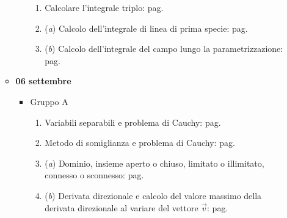\documentclass[a4paper]{article}
\begin{document}
\begin{itemize}
\begin{itemize}
\begin{itemize}
\begin{enumerate}[label*=Ex. \arabic*), leftmargin = 4em]
					\item Calcolare l'integrale triplo: pag.~\hyperlink{
						exam: esame 10 luglio 2023 - Gruppo A - 7 esercizio
					}{
					}

					\item (\emph{a}) Calcolo dell'integrale di linea di prima specie:\newline%
					pag.~\hyperlink{
						exam: esame 06 settembre 2023 - Gruppo A - 8 esercizio (a)
					}{
					}

					\setcounter{enumi}{7}

					\item (\emph{b}) Calcolo dell'integrale del campo lungo la parametrizzazione: pag.~\hyperlink{
						exam: esame 06 settembre 2023 - Gruppo A - 8 esercizio (b)
					}{
					}
				\end{enumerate}
			\end{itemize}

			\item \textbf{06 settembre}
			\begin{itemize}
				\item Gruppo A
				\begin{enumerate}[label*=Ex. \arabic*), leftmargin = 4em]
					\item Variabili separabili e problema di Cauchy: pag.~\hyperlink{
						exam: esame 06 settembre 2023 - Gruppo A - 1 esercizio
					}{
					}
					
					\item Metodo di somiglianza e problema di Cauchy: pag.~\hyperlink{
						exam: esame 06 settembre 2023 - Gruppo A - 2 esercizio
					}{
					}
					
					\item (\emph{a}) Dominio, insieme aperto o chiuso, limitato o illimitato, connesso o sconnesso: pag.~\hyperlink{
						exam: esame 06 settembre 2023 - Gruppo A - 3 esercizio (a)
					}{
					}

					\setcounter{enumi}{2}
					
					\item (\emph{b}) Derivata direzionale e calcolo del valore massimo della derivata direzionale al variare del vettore $\overrightarrow{v}$: pag.
					\hyperlink{
						exam: esame 06 settembre 2023 - Gruppo A - 3 esercizio (b)
					}{
					}
					

\end{enumerate}
\end{itemize}
\end{itemize}
\end{itemize}
\end{document}

